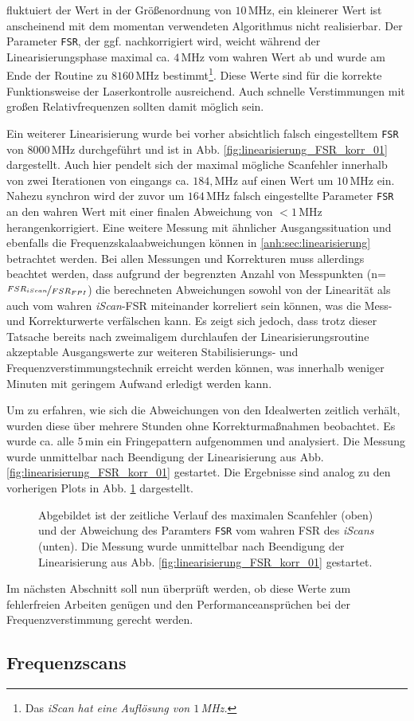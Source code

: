fluktuiert der Wert in der Größenordnung von $10\,$MHz, ein kleinerer Wert ist
anscheinend mit dem momentan verwendeten Algorithmus nicht realisierbar. Der
Parameter \lstinline|FSR|, der ggf. nachkorrigiert wird, weicht während der
Linearisierungsphase maximal ca. $4\,$MHz vom wahren Wert ab und wurde am Ende
der Routine zu $8160\,$MHz bestimmt\footnote{Das \textit{iScan hat eine Auflösung von
$1\,$MHz.}}. Diese Werte sind für die korrekte Funktionsweise der
Laserkontrolle ausreichend. Auch schnelle Verstimmungen mit großen
Relativfrequenzen sollten damit möglich sein.\par
Ein weiterer Linearisierung wurde bei vorher absichtlich falsch eingestelltem
\lstinline|FSR| von $8000\,$MHz durchgeführt und ist in Abb.
\ref{fig:linearisierung_FSR_korr_01} dargestellt. Auch hier pendelt sich der
maximal mögliche Scanfehler innerhalb von zwei Iterationen von eingangs ca.
$184,$MHz auf einen Wert um $10\,$MHz ein. Nahezu synchron wird der zuvor um
$164\,$MHz falsch eingestellte Parameter \lstinline|FSR| an den wahren Wert
mit einer finalen Abweichung von $<1\,$MHz herangenkorrigiert. Eine weitere
Messung mit ähnlicher Ausgangssituation und ebenfalls die
Frequenzskalaabweichungen können in \ref{anh:sec:linearisierung} betrachtet
werden. Bei allen Messungen und Korrekturen muss allerdings beachtet werden,
dass aufgrund der begrenzten Anzahl von Messpunkten
(n=$\nicefrac{FSR_{iScan}}{FSR_{FPI}}$) die berechneten Abweichungen sowohl von
der Linearität als auch vom wahren \textit{iScan}-FSR miteinander korreliert
sein können, was die Mess- und Korrekturwerte verfälschen kann. Es zeigt sich
jedoch, dass trotz dieser Tatsache bereits nach zweimaligem durchlaufen der
Linearisierungsroutine akzeptable Ausgangswerte zur weiteren Stabilisierungs- und
Frequenzverstimmungstechnik erreicht werden können, was innerhalb weniger
Minuten mit geringem Aufwand erledigt werden kann.\par
Um zu erfahren, wie sich die Abweichungen von den Idealwerten zeitlich verhält,
wurden diese über mehrere Stunden ohne Korrekturmaßnahmen beobachtet. Es wurde
ca. alle $5\,$min ein Fringepattern aufgenommen und analysiert. Die
Messung wurde unmittelbar nach Beendigung der Linearisierung aus Abb.
\ref{fig:linearisierung_FSR_korr_01} gestartet.
Die Ergebnisse sind analog zu den vorherigen Plots in Abb.
\ref{fig:linearitaet_verlauf} dargestellt.
\begin{figure}[h]
 	\centering
 	\footnotesize
	
	\caption[Linearitaet \textit{iScan}, zeitlicher Verlauf]{Abgebildet
	ist der zeitliche Verlauf des maximalen Scanfehler (oben) und der Abweichung
	des Paramters \lstinline|FSR| vom wahren FSR des \textit{iScans} (unten). Die
	Messung wurde unmittelbar nach Beendigung der Linearisierung aus Abb.
	\ref{fig:linearisierung_FSR_korr_01} gestartet.}
	\label{fig:linearitaet_verlauf}
\end{figure}


Im nächsten Abschnitt soll nun überprüft werden, ob diese Werte zum fehlerfreien
Arbeiten genügen und den Performanceansprüchen bei der Frequenzverstimmung gerecht werden.

\subsection{Frequenzscans}\label{sec:frequenz_scans}

